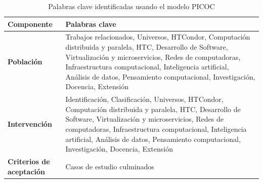\begin{table}[htbp]
    \centering
    \caption{Palabras clave identificadas usando el modelo PICOC}
    \label{table:picoc_keywords}
    \renewcommand{\arraystretch}{1.5}  %
    \begin{tabular}{p{1.8cm}p{5.7cm}}
        \toprule
        \textbf{Componente}              & \textbf{Palabras clave}                                                                                                                                                                                                                                                                                                                                                                                                                                                                                                                      \\
        \midrule
        \textbf{Población}               & Trabajos relacionados, Universos, HTCondor, Computación distribuida y paralela, HTC, Desarrollo de Software, Virtualización y microservicios, Redes de computadoras, Infraestructura computacional, Inteligencia artificial, Análisis de datos, Pensamiento computacional, Investigación, Docencia, Extensión                                                                                                                                                                                                                                \\
        \addlinespace[0.8em]
        \textbf{Intervención}            & Identificación, Clasificación, Universos, HTCondor, Computación distribuida y paralela, HTC, Desarrollo de Software, Virtualización y microservicios, Redes de computadoras, Infraestructura computacional, Inteligencia artificial, Análisis de datos, Pensamiento computacional, Investigación, Docencia, Extensión                                                                                                                                                                                                                        \\
        \addlinespace[0.8em]
        \textbf{Criterios de aceptación} & Casos de estudio culminados                                                                                                                                                                                                                                                                                                                                                                                                                                                                                                                  \\

\end{tabular}
\end{table}
